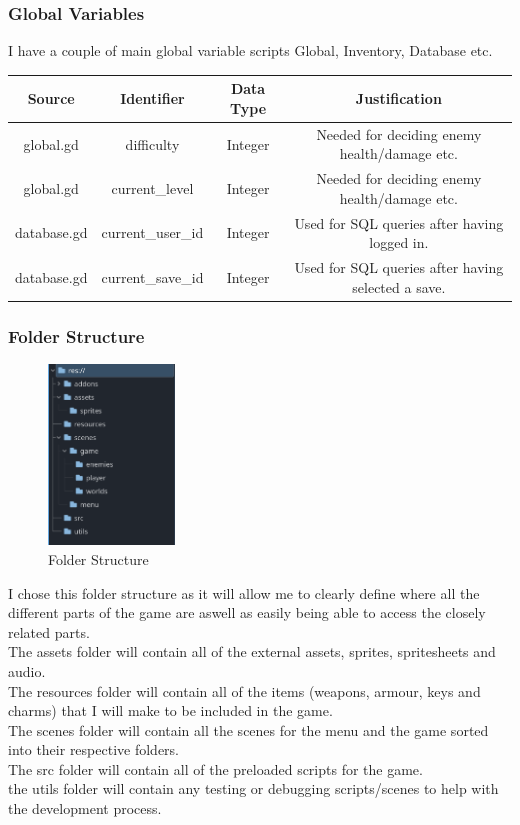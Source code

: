 \documentclass{article}
\begin{document}
        \subsubsection{Global Variables}
        I have a couple of main global variable scripts Global, Inventory, Database etc.\\
        \begin{tabular}{|c|c|c|c|}
                \hline
                Source&Identifier&Data Type&Justification\\
                \hline
                global.gd&difficulty&Integer&Needed for deciding enemy health/damage etc.\\
                \hline
                global.gd&current\_level&Integer&Needed for deciding enemy health/damage etc.\\
                \hline
                database.gd&current\_user\_id&Integer&Used for SQL queries after having logged in.\\
                \hline
                database.gd&current\_save\_id&Integer&Used for SQL queries after having selected a save.\\
                \hline
        \end{tabular}
        \subsubsection{Folder Structure}
        \begin{figure}[H]
                \centering
                \includegraphics[width = 0.3\textwidth]{images/design/File_System.PNG}
                \caption{Folder Structure}
        \end{figure}
        I chose this folder structure as it will allow me to clearly define where all the different parts of the game are aswell as easily being able to access the closely related parts.\\
        The assets folder will contain all of the external assets, sprites, spritesheets and audio.\\
        The resources folder will contain all of the items (weapons, armour, keys and charms) that I will make to be included in the game.\\
        The scenes folder will contain all the scenes for the menu and the game sorted into their respective folders.\\
        The src folder will contain all of the preloaded scripts for the game.\\
        the utils folder will contain any testing or debugging scripts/scenes to help with the development process.\\
\end{document}
